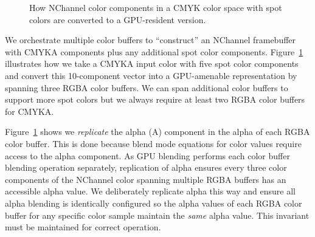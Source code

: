 
\begin{figure}[tb]
  \caption{\label{fig:cmyk-to-rgba} How NChannel color components in a CMYK color space with spot colors are converted to a GPU-resident version.}
\end{figure}

We orchestrate multiple color buffers to ``construct'' an NChannel framebuffer with CMYKA components plus any
additional spot color components.
Figure~\ref{fig:cmyk-to-rgba} illustrates how we take a CMYKA input color with five spot color components
and convert this 10-component vector into a GPU-amenable representation by spanning three RGBA color buffers.
We can span additional color buffers to support more spot colors but we always require at least two
RGBA color buffers for CMYKA.

Figure~\ref{fig:cmyk-to-rgba} shows we {\em replicate} the alpha (A) component in the alpha of each RGBA color buffer.
This is done because blend mode equations for color values require access to the alpha component.  As GPU blending performs
each color buffer blending operation separately, replication of alpha ensures every three color components
of the NChannel color spanning multiple RGBA buffers has an accessible alpha value.  We deliberately replicate
alpha this way and ensure all alpha blending is identically configured so the alpha values of
each RGBA color buffer for any specific color sample maintain the {\em same} alpha value.
This invariant must be maintained for correct operation.

